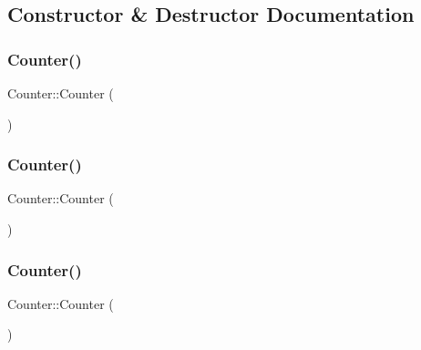 \subsection{Constructor \& Destructor Documentation}
\mbox{\label{class_counter_a1e05f69b5240fbab3e7ab351672167f0}} 
\subsubsection{\texorpdfstring{Counter()}{Counter()}\hspace{0.1cm}{\footnotesize\ttfamily [1/3]}}
{\footnotesize\ttfamily Counter\+::\+Counter (\begin{DoxyParamCaption}{ }\end{DoxyParamCaption})\hspace{0.3cm}{\ttfamily [inline]}}

\mbox{\label{class_counter_a1e05f69b5240fbab3e7ab351672167f0}} 
\subsubsection{\texorpdfstring{Counter()}{Counter()}\hspace{0.1cm}{\footnotesize\ttfamily [2/3]}}
{\footnotesize\ttfamily Counter\+::\+Counter (\begin{DoxyParamCaption}{ }\end{DoxyParamCaption})\hspace{0.3cm}{\ttfamily [inline]}}

\mbox{\label{class_counter_a1e05f69b5240fbab3e7ab351672167f0}} 
\subsubsection{\texorpdfstring{Counter()}{Counter()}\hspace{0.1cm}{\footnotesize\ttfamily [3/3]}}
{\footnotesize\ttfamily Counter\+::\+Counter (\begin{DoxyParamCaption}{ }\end{DoxyParamCaption})\hspace{0.3cm}{\ttfamily [inline]}}



